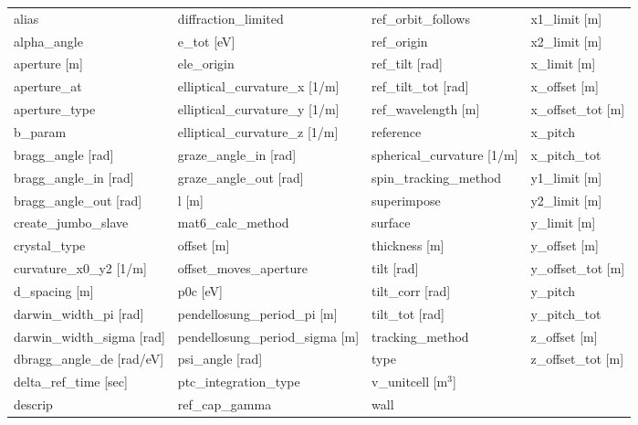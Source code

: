  \begin{tabular}{llll} \toprule
alias                          & diffraction_limited            & ref_orbit_follows              & x1_limit [m]                   \\
alpha_angle                    & e_tot [eV]                     & ref_origin                     & x2_limit [m]                   \\
aperture [m]                   & ele_origin                     & ref_tilt [rad]                 & x_limit [m]                    \\
aperture_at                    & elliptical_curvature_x [1/m]   & ref_tilt_tot [rad]             & x_offset [m]                   \\
aperture_type                  & elliptical_curvature_y [1/m]   & ref_wavelength [m]             & x_offset_tot [m]               \\
b_param                        & elliptical_curvature_z [1/m]   & reference                      & x_pitch                        \\
bragg_angle [rad]              & graze_angle_in [rad]           & spherical_curvature [1/m]      & x_pitch_tot                    \\
bragg_angle_in [rad]           & graze_angle_out [rad]          & spin_tracking_method           & y1_limit [m]                   \\
bragg_angle_out [rad]          & l [m]                          & superimpose                    & y2_limit [m]                   \\
create_jumbo_slave             & mat6_calc_method               & surface                        & y_limit [m]                    \\
crystal_type                   & offset [m]                     & thickness [m]                  & y_offset [m]                   \\
curvature_x0_y2 [1/m]          & offset_moves_aperture          & tilt [rad]                     & y_offset_tot [m]               \\
d_spacing [m]                  & p0c [eV]                       & tilt_corr [rad]                & y_pitch                        \\
darwin_width_pi [rad]          & pendellosung_period_pi [m]     & tilt_tot [rad]                 & y_pitch_tot                    \\
darwin_width_sigma [rad]       & pendellosung_period_sigma [m]  & tracking_method                & z_offset [m]                   \\
dbragg_angle_de [rad/eV]       & psi_angle [rad]                & type                           & z_offset_tot [m]               \\
delta_ref_time [sec]           & ptc_integration_type           & v_unitcell [m$^3$]             &                                \\
descrip                        & ref_cap_gamma                  & wall                           &                                \\
 \bottomrule
 \end{tabular}
 \vfill


